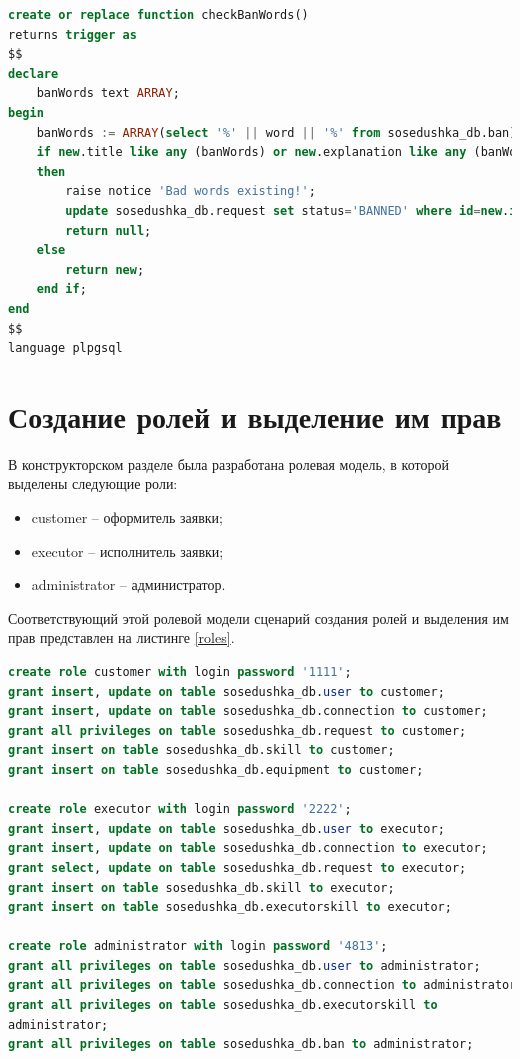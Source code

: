 \captionsetup{singlelinecheck = false, justification=raggedright}
\begin{lstlisting}[language=sql, caption=Реализация функции checkBanWords(), label=trigger_func]
create or replace function checkBanWords()
returns trigger as 
$$
declare 
	banWords text ARRAY;
begin 
	banWords := ARRAY(select '%' || word || '%' from sosedushka_db.ban);
	if new.title like any (banWords) or new.explanation like any (banWords)
	then
		raise notice 'Bad words existing!';
		update sosedushka_db.request set status='BANNED' where id=new.id;
		return null;
	else
		return new;
	end if;
end
$$
language plpgsql
\end{lstlisting}
\captionsetup{singlelinecheck = false, justification=centering}

\section{Создание ролей и выделение им прав}

В конструкторском разделе была разработана ролевая модель, в которой выделены следующие роли:
\begin{itemize}
	\item customer -- оформитель заявки;
	\item executor -- исполнитель заявки;
	\item administrator -- администратор.
\end{itemize}

Соответствующий этой ролевой модели сценарий создания ролей и выделения им прав представлен на листинге \ref{roles}.\newpage

\captionsetup{singlelinecheck = false, justification=raggedright}
\begin{lstlisting}[language=sql, caption=Создание ролей и выделение им прав, label=roles]
create role customer with login password '1111';
grant insert, update on table sosedushka_db.user to customer;
grant insert, update on table sosedushka_db.connection to customer;
grant all privileges on table sosedushka_db.request to customer;
grant insert on table sosedushka_db.skill to customer;
grant insert on table sosedushka_db.equipment to customer;

create role executor with login password '2222';
grant insert, update on table sosedushka_db.user to executor;
grant insert, update on table sosedushka_db.connection to executor;
grant select, update on table sosedushka_db.request to executor;
grant insert on table sosedushka_db.skill to executor;
grant insert on table sosedushka_db.executorskill to executor;

create role administrator with login password '4813';
grant all privileges on table sosedushka_db.user to administrator;
grant all privileges on table sosedushka_db.connection to administrator;
grant all privileges on table sosedushka_db.executorskill to
administrator;
grant all privileges on table sosedushka_db.ban to administrator;
\end{lstlisting}
\captionsetup{singlelinecheck = false, justification=centering}

